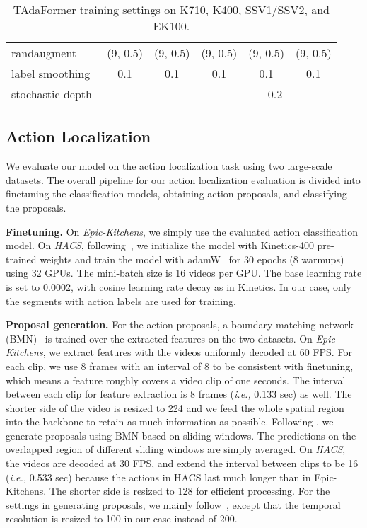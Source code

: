 \documentclass[10pt,journal,compsoc]{IEEEtran}
\begin{document}
\begin{table*}[t]
\begin{tabular}{l|cc|cc|cc|cc|cc}
         randaugment~\cite{randaugment} & \multicolumn{2}{c|}{(9, 0.5)} & \multicolumn{2}{c|}{(9, 0.5)} & \multicolumn{2}{c|}{(9, 0.5)} & \multicolumn{2}{c|}{(9, 0.5)} & \multicolumn{2}{c}{(9, 0.5)}\\ 
         label smoothing~\cite{szegedy2016inceptionv3} & \multicolumn{2}{c|}{0.1} & \multicolumn{2}{c|}{0.1} & \multicolumn{2}{c|}{0.1} & \multicolumn{2}{c|}{0.1} & \multicolumn{2}{c}{0.1}\\
         stochastic depth & \multicolumn{2}{c|}{-} & \multicolumn{2}{c|}{-} & \multicolumn{2}{c|}{-} & - & 0.2 & \multicolumn{2}{c}{-}\\
         \bottomrule
    \end{tabular}
    \caption{TAdaFormer training settings on K710, K400, SSV1/SSV2, and EK100.}
    \label{tab:training_tadaformer}
\end{table*}


\subsection{Action Localization}
We evaluate our model on the action localization task using two large-scale datasets. 
The overall pipeline for our action localization evaluation is divided into finetuning the classification models, obtaining action proposals, and classifying the proposals.

\textbf{Finetuning. }On \textit{Epic-Kitchens}, we simply use the evaluated action classification model. On \textit{HACS}, following~\cite{hacscompetition}, we initialize the model with Kinetics-400 pre-trained weights and train the model with adamW~\cite{adamw} for 30 epochs (8 warmups) using 32 GPUs. 
The mini-batch size is 16 videos per GPU. 
The base learning rate is set to 0.0002, with cosine learning rate decay as in Kinetics.
In our case, only the segments with action labels are used for training.

\textbf{Proposal generation.} 
For the action proposals, a boundary matching network (BMN)~\cite{bmn} is trained over the extracted features on the two datasets. 
On \textit{Epic-Kitchens}, we extract features with the videos uniformly decoded at 60 FPS. 
For each clip, we use 8 frames with an interval of 8 to be consistent with finetuning, which means a feature roughly covers a video clip of one seconds. 
The interval between each clip for feature extraction is 8 frames (\textit{i.e.,} 0.133 sec) as well.
The shorter side of the video is resized to 224 and we feed the whole spatial region into the backbone to retain as much information as possible.
Following \cite{ek100actionlocalization}, we generate proposals using BMN based on sliding windows.
The predictions on the overlapped region of different sliding windows are simply averaged.
On \textit{HACS}, the videos are decoded at 30 FPS, and extend the interval between clips to be 16 (\textit{i.e.,} 0.533 sec) because the actions in HACS last much longer than in Epic-Kitchens. 
The shorter side is resized to 128 for efficient processing. 
For the settings in generating proposals, we mainly follow~\cite{hacscompetition}, except that the temporal resolution is resized to 100 in our case instead of 200.
\end{document}
